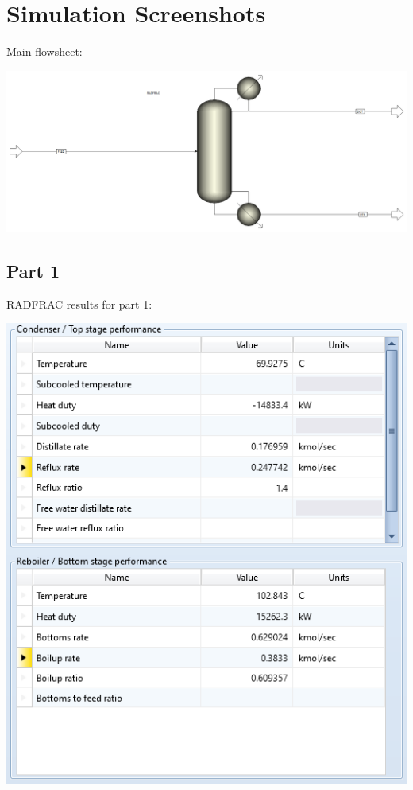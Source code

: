 \documentclass[12pt]{article}
\begin{document}
\section{Simulation Screenshots}

Main flowsheet:

\includegraphics[scale=0.3]{flowsheet.png}

\subsection{Part 1}

RADFRAC results for part 1:

\includegraphics[scale=1]{parti.png}
\end{document}
